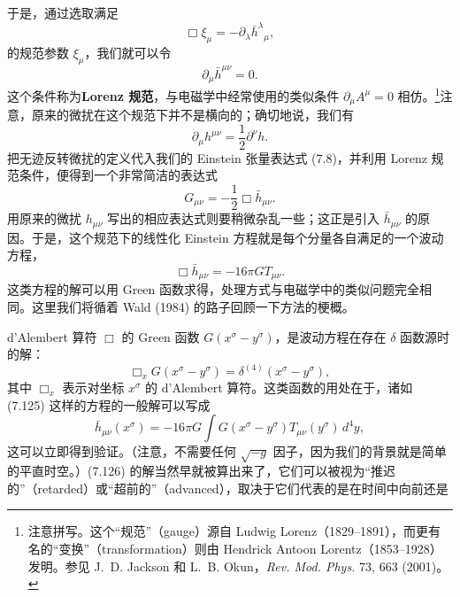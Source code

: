 于是，通过选取满足
\begin{equation*}
\Box\xi_\mu = -\partial_\lambda\bar{h}^{\lambda}{}_{\mu},
\tag{7.121}
\end{equation*}
的规范参数 $\xi_\mu$，我们就可以令
\begin{equation*}
\partial_\mu\bar{h}^{\mu\nu} = 0.
\tag{7.122}
\end{equation*}
这个条件称为\textbf{Lorenz 规范}，与电磁学中经常使用的类似条件 $\partial_\mu A^\mu = 0$ 相仿。\footnote{注意拼写。这个“规范”（gauge）源自 Ludwig Lorenz（1829--1891），而更有名的“变换”（transformation）则由 Hendrick Antoon Lorentz（1853--1928）发明。参见 J.~D. Jackson 和 L.~B. Okun，\emph{Rev. Mod. Phys.} 73, 663 (2001)。}注意，原来的微扰在这个规范下并不是横向的；确切地说，我们有
\begin{equation*}
\partial_\mu h^{\mu\nu} = \frac{1}{2}\partial^\nu h.
\tag{7.123}
\end{equation*}
把无迹反转微扰的定义代入我们的 Einstein 张量表达式 (7.8)，并利用 Lorenz 规范条件，便得到一个非常简洁的表达式
\begin{equation*}
G_{\mu\nu} = -\frac{1}{2}\Box\bar{h}_{\mu\nu}.
\tag{7.124}
\end{equation*}
用原来的微扰 $h_{\mu\nu}$ 写出的相应表达式则要稍微杂乱一些；这正是引入 $\bar{h}_{\mu\nu}$ 的原因。于是，这个规范下的线性化 Einstein 方程就是每个分量各自满足的一个波动方程，
\begin{equation*}
\Box\bar{h}_{\mu\nu} = -16\pi G T_{\mu\nu}.
\tag{7.125}
\end{equation*}
这类方程的解可以用 Green 函数求得，处理方式与电磁学中的类似问题完全相同。这里我们将循着 Wald (1984) 的路子回顾一下方法的梗概。

d'Alembert 算符 $\Box$ 的 Green 函数 $G(x^\sigma - y^\sigma)$，是波动方程在存在 $\delta$ 函数源时的解：
\begin{equation*}
\Box_x G(x^\sigma - y^\sigma) = \delta^{(4)}(x^\sigma - y^\sigma),
\tag{7.126}
\end{equation*}
其中 $\Box_x$ 表示对坐标 $x^\sigma$ 的 d'Alembert 算符。这类函数的用处在于，诸如 (7.125) 这样的方程的一般解可以写成
\begin{equation*}
\bar{h}_{\mu\nu}(x^\sigma) = -16\pi G\int G(x^\sigma - y^\sigma)T_{\mu\nu}(y^\sigma)\, d^{4}y,
\tag{7.127}
\end{equation*}
这可以立即得到验证。（注意，不需要任何 $\sqrt{-g}$ 因子，因为我们的背景就是简单的平直时空。）(7.126) 的解当然早就被算出来了，它们可以被视为“推迟的”（retarded）或“超前的”（advanced），取决于它们代表的是在时间中向前还是

